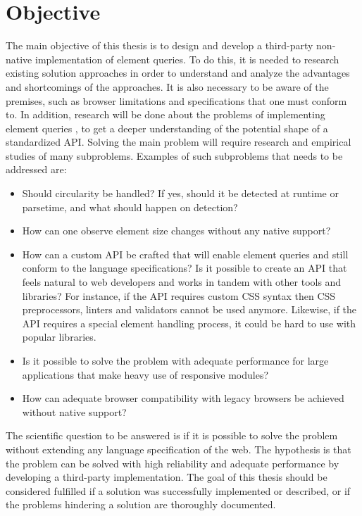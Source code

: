 \documentclass[a4paper,11pt]{kth-mag}
\begin{document}
    \section{Objective}
      The main objective of this thesis is to design and develop a \gls{third-party} non-\gls{native} implementation of element queries.
      To do this, it is needed to research existing solution approaches in order to understand and analyze the advantages and shortcomings of the approaches.
      It is also necessary to be aware of the premises, such as \gls{browser} limitations and specifications that one must conform to.
      In addition, research will be done about the problems of implementing element queries , to get a deeper understanding of the potential shape of a standardized \gls{API}.
      Solving the main problem will require research and empirical studies of many subproblems.
      Examples of such subproblems that needs to be addressed are:
      \begin{itemize}
        \item Should circularity be handled? If yes, should it be detected at runtime or parsetime, and what should happen on detection?
        \item How can one observe \gls{element} size changes without any \gls{native} support?
        \item
          How can a custom \gls{API} be crafted that will enable element queries and still conform to the language specifications? Is it possible to create an \gls{API} that feels natural to \gls{web} developers and works in tandem with other tools and libraries?
          For instance, if the \gls{API} requires custom \gls{CSS} syntax then \gls{CSS} preprocessors, linters and validators cannot be used anymore.
          Likewise, if the \gls{API} requires a special \gls{element} handling process, it could be hard to use with popular libraries. 
        \item Is it possible to solve the problem with adequate performance for large applications that make heavy use of responsive modules?
        \item How can adequate \gls{browser} compatibility with legacy browsers be achieved without \gls{native} support?
      \end{itemize}
      The scientific question to be answered is if it is possible to solve the problem without extending any language specification of the \gls{web}.
      The hypothesis is that the problem can be solved with high reliability and adequate performance by developing a \gls{third-party} implementation.
      The goal of this thesis should be considered fulfilled if a solution was successfully implemented or described, or if the problems hindering a solution are thoroughly documented.
\end{document}
